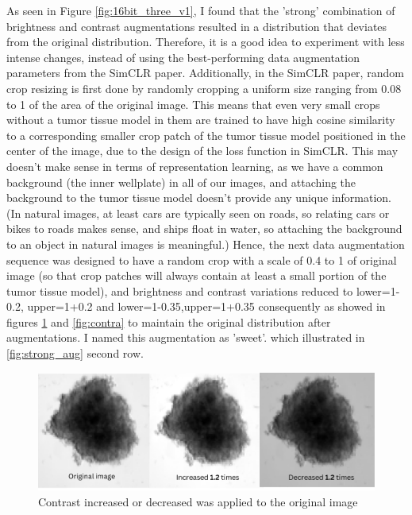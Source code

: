   As seen in Figure \ref{fig:16bit_three_v1}, I found that the 'strong' combination of brightness and contrast augmentations resulted in a distribution that deviates from the original distribution. Therefore, it is a good idea to experiment with less intense changes, instead of using the best-performing data augmentation parameters from the SimCLR paper. Additionally, in the SimCLR paper, random crop resizing is first done by randomly cropping a uniform size ranging from 0.08 to 1 of the area of the original image. This means that even very small crops without a tumor tissue model in them are trained to have high cosine similarity to a corresponding smaller crop patch of the tumor tissue model positioned in the center of the image, due to the design of the loss function in SimCLR. This may doesn't make sense in terms of representation learning, as we have a common background (the inner wellplate) in all of our images, and attaching the background to the tumor tissue model doesn't provide any unique information. (In natural images, at least cars are typically seen on roads, so relating cars or bikes to roads makes sense, and ships float in water, so attaching the background to an object in natural images is meaningful.) Hence, the next data augmentation sequence was designed to have a random crop with a scale of 0.4 to 1 of original image (so that crop patches will always contain at least a small portion of the tumor tissue model), and brightness and contrast variations reduced to lower=1-0.2, upper=1+0.2 and lower=1-0.35,upper=1+0.35 consequently as showed in figures  \ref{fig:bright} and  \ref{fig:contra} to maintain the original distribution after augmentations. I named this augmentation as 'sweet'. which illustrated in \ref{fig:strong_aug} second row.

  \begin{figure}[H]
    \centering
    \includegraphics[scale=0.23]{figures/bright.png} 
    \caption{Contrast increased or decreased was applied to the original image}
    \label{fig:bright}
  \end{figure}

